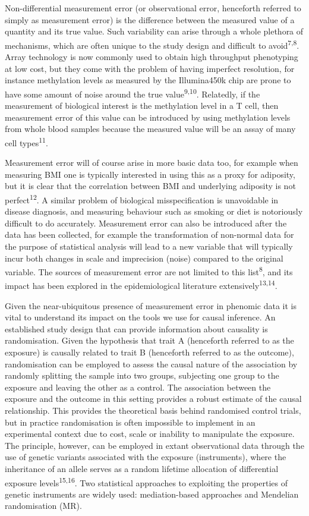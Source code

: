 \documentclass[]{article}
\begin{document}
Non-differential measurement error (or observational error, henceforth
referred to simply as measurement error) is the difference between the
measured value of a quantity and its true value. Such variability can
arise through a whole plethora of mechanisms, which are often unique to
the study design and difficult to avoid\textsuperscript{7,8}. Array
technology is now commonly used to obtain high throughput phenotyping at
low cost, but they come with the problem of having imperfect resolution,
for instance methylation levels as measured by the Illumina450k chip are
prone to have some amount of noise around the true
value\textsuperscript{9,10}. Relatedly, if the measurement of biological
interest is the methylation level in a T cell, then measurement error of
this value can be introduced by using methylation levels from whole
blood samples because the measured value will be an assay of many cell
types\textsuperscript{11}.

Measurement error will of course arise in more basic data too, for
example when measuring BMI one is typically interested in using this as
a proxy for adiposity, but it is clear that the correlation between BMI
and underlying adiposity is not perfect\textsuperscript{12}. A similar
problem of biological misspecification is unavoidable in disease
diagnosis, and measuring behaviour such as smoking or diet is
notoriously difficult to do accurately. Measurement error can also be
introduced after the data has been collected, for example the
transformation of non-normal data for the purpose of statistical
analysis will lead to a new variable that will typically incur both
changes in scale and imprecision (noise) compared to the original
variable. The sources of measurement error are not limited to this
list\textsuperscript{8}, and its impact has been explored in the
epidemiological literature extensively\textsuperscript{13,14}.

Given the near-ubiquitous presence of measurement error in phenomic data
it is vital to understand its impact on the tools we use for causal
inference. An established study design that can provide information
about causality is randomisation. Given the hypothesis that trait A
(henceforth referred to as the exposure) is causally related to trait B
(henceforth referred to as the outcome), randomisation can be employed
to assess the causal nature of the association by randomly splitting the
sample into two groups, subjecting one group to the exposure and leaving
the other as a control. The association between the exposure and the
outcome in this setting provides a robust estimate of the causal
relationship. This provides the theoretical basis behind randomised
control trials, but in practice randomisation is often impossible to
implement in an experimental context due to cost, scale or inability to
manipulate the exposure. The principle, however, can be employed in
extant observational data through the use of genetic variants associated
with the exposure (instruments), where the inheritance of an allele
serves as a random lifetime allocation of differential exposure
levels\textsuperscript{15,16}. Two statistical approaches to exploiting
the properties of genetic instruments are widely used: mediation-based
approaches and Mendelian randomisation (MR).
\end{document}
